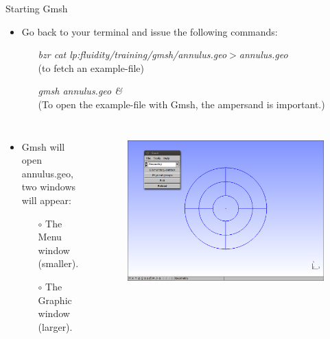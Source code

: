 \documentclass[t]{beamer}
\begin{document}
\begin{frame}{Starting Gmsh}
\begin{itemize}
   \item Go back to your terminal and issue the following commands:\\
   \begin{itemize}
      \item[]\hspace{-60pt}\emph{bzr cat lp:fluidity/training/gmsh/annulus.geo$>$annulus.geo}\\ (to fetch an example-file)\\
      \item[]\hspace{-60pt}\emph{gmsh annulus.geo \&}\\ (To open the example-file with Gmsh, the ampersand is important.)
   \end{itemize}
\end{itemize}
\vspace{-18pt}
\begin{columns}[l]
\column{2.3in}
  \begin{itemize} 
     \item Gmsh will open annulus.geo, two windows will appear:
     \begin{itemize}
        \item[$\circ$] The Menu window (smaller).
        \item[$\circ$] The Graphic window (larger).
     \end{itemize}
  \end{itemize}
\column{2.2in}
\begin{figure}[htbp!]
 \centering
  \includegraphics[width=1.0\textwidth]{../figures/annulus1}
  \label{fig:annulus1}
\end{figure}
\end{columns}
\end{frame}
\end{document}
